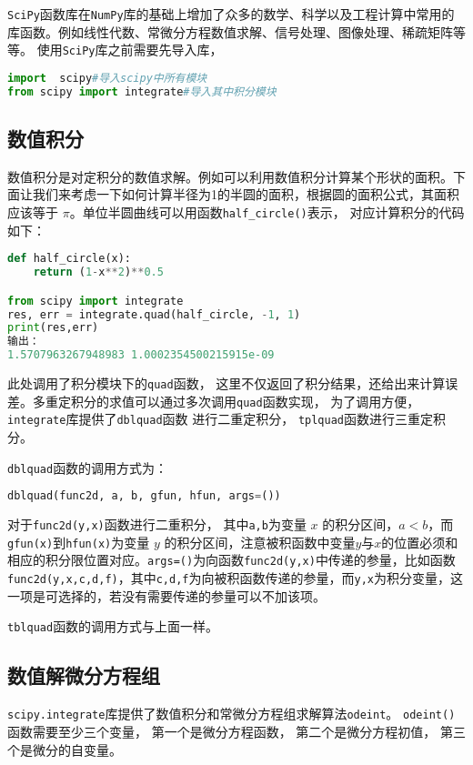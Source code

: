 
\verb|SciPy|函数库在\verb|NumPy|库的基础上增加了众多的数学、科学以及工程计算中常用的库函数。例如线性代数、常微分方程数值求解、信号处理、图像处理、稀疏矩阵等等。
使用\verb|SciPy|库之前需要先导入库，
\begin{lstlisting}[language=python]
import  scipy#导入scipy中所有模块
from scipy import integrate#导入其中积分模块
\end{lstlisting}
\subsection{数值积分}
数值积分是对定积分的数值求解。例如可以利用数值积分计算某个形状的面积。下面让我们来考虑一下如何计算半径为1的半圆的面积，根据圆的面积公式，其面积应该等于 $\pi$。单位半圆曲线可以用函数\verb|half_circle()|表示， 对应计算积分的代码如下：
\begin{lstlisting}[language=python]
def half_circle(x):
    return (1-x**2)**0.5

from scipy import integrate
res, err = integrate.quad(half_circle, -1, 1)
print(res,err)
输出：
1.5707963267948983 1.0002354500215915e-09
\end{lstlisting}
此处调用了积分模块下的\verb|quad|函数， 这里不仅返回了积分结果，还给出来计算误差。多重定积分的求值可以通过多次调用\verb|quad|函数实现， 为了调用方便， \verb|integrate|库提供了\verb|dblquad|函数
进行二重定积分， \verb|tplquad|函数进行三重定积分。

\verb|dblquad|函数的调用方式为：
\begin{lstlisting}[language=python]
dblquad(func2d, a, b, gfun, hfun, args=())
\end{lstlisting}
对于\verb|func2d(y,x)|函数进行二重积分， 其中\verb|a,b|为变量 $x$ 的积分区间，$ a < b $，而\verb|gfun(x)|到\verb|hfun(x)|为变量 $y$ 的积分区间，注意被积函数中变量$ y $与$ x $的位置必须和相应的积分限位置对应。\verb|args=()|为向函数\verb|func2d(y,x)|中传递的参量，比如函数\verb|func2d(y,x,c,d,f)|，其中\verb|c,d,f|为向被积函数传递的参量，而\verb|y,x|为积分变量，这一项是可选择的，若没有需要传递的参量可以不加该项。

\verb|tblquad|函数的调用方式与上面一样。

\subsection{数值解微分方程组}
\verb|scipy.integrate|库提供了数值积分和常微分方程组求解算法\verb|odeint|。
\verb|odeint()|函数需要至少三个变量， 第一个是微分方程函数， 第二个是微分方程初值， 第三个是微分的自变量。

